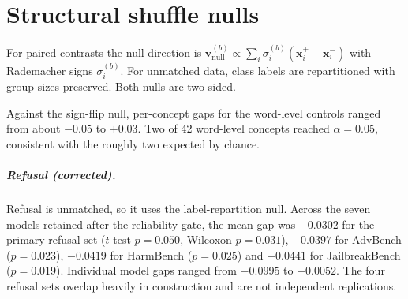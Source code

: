 \documentclass[11pt]{report}
\newif\ifnumberedrefs
\begin{document}
\ifnumberedrefs\else\fi


\appendix
\chapter{Structural shuffle nulls}\label{app:nulls}
For paired contrasts the null direction is
$\mathbf{v}^{(b)}_{\text{null}} \propto \sum_i \sigma^{(b)}_i(\mathbf{x}^+_i -
\mathbf{x}^-_i)$ with Rademacher signs $\sigma^{(b)}_i$. For unmatched data,
class labels are repartitioned with group sizes preserved. Both nulls are
two-sided.

Against the sign-flip null, per-concept gaps for the word-level controls ranged
from about $-0.05$ to $+0.03$. Two of 42 word-level concepts reached $\alpha =
0.05$, consistent with the roughly two expected by chance.

\paragraph{Refusal (corrected).} Refusal is unmatched, so it uses the
label-repartition null. Across the seven models retained after the reliability
gate, the mean gap was $-0.0302$ for the primary refusal set ($t$-test
$p = 0.050$, Wilcoxon $p = 0.031$), $-0.0397$ for AdvBench ($p = 0.023$),
$-0.0419$ for HarmBench ($p = 0.025$) and $-0.0441$ for JailbreakBench
($p = 0.019$). Individual model gaps ranged from $-0.0995$ to $+0.0052$. The
four refusal sets overlap heavily in construction and are not independent
replications.

\end{document}
